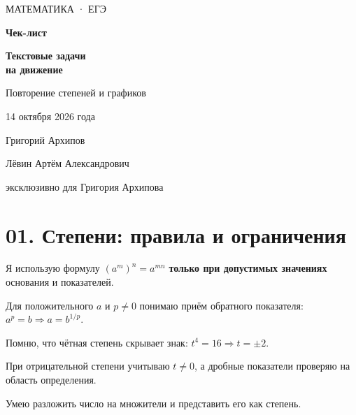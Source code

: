 \documentclass[a4paper,12pt]{article}
\newcommand{\ruleline}{\par\vspace{0.25em}{\color{accent!70}\hrule height 0.6pt}\vspace{0.7em}}
\newcommand{\checkitem}[1]{\item[$\square$] #1}
\begin{document}
\begin{titlepage}
\thispagestyle{empty}
\begin{center}
\vspace*{36mm}
{\color{accent}\small МАТЕМАТИКА · ЕГЭ}\par
\vspace{18mm}
{\fontsize{33}{40}\selectfont\bfseries Чек-лист}\par
\vspace{11mm}
{\fontsize{20}{27}\selectfont\bfseries Текстовые задачи\\на движение}\par
\vspace{5mm}
{\large Повторение степеней и графиков}\par
\vspace{23mm}
{\color{muted}\large 14 октября 2026 года}\par
\vspace{7mm}
{\color{darkaccent}\large Григорий Архипов}\par
\vfill
{\small Лёвин Артём Александрович}\par
{\small эксклюзивно для Григория Архипова}\par
\vspace{27mm}
\end{center}
\end{titlepage}

\section*{01. Степени: правила и ограничения}
\ruleline
\begin{checklist}
\checkitem{Я использую формулу \((a^m)^n=a^{mn}\) \textbf{только при допустимых значениях} основания и показателей.}
\checkitem{Для положительного \(a\) и \(p\ne0\) понимаю приём обратного показателя: \(a^p=b\Rightarrow a=b^{1/p}\).}
\checkitem{Помню, что чётная степень скрывает знак: \(t^4=16\Rightarrow t=\pm2\).}
\checkitem{При отрицательной степени учитываю \(t\ne0\), а дробные показатели проверяю на область определения.}
\checkitem{Умею разложить число на множители и представить его как степень.}
\end{checklist}
\end{document}
